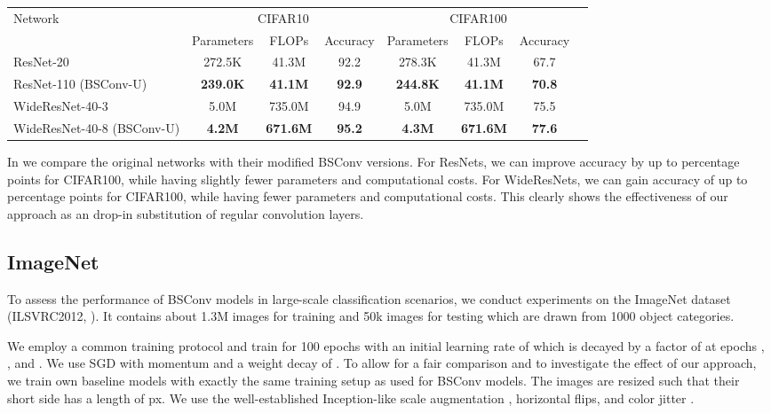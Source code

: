 \documentclass[10pt,twocolumn,letterpaper]{article}
\newcommand{\DCCK}{BSConv\xspace}
\newcommand{\DCCKU}{\DCCK-U\xspace}
\begin{document}
\begin{table*}
	\begin{center}
		\begin{tabular}{|l|c|c|c|c|c|c|c|}
			\hline
			Network & \multicolumn{3}{|c|}{CIFAR10} & \multicolumn{3}{|c|}{CIFAR100} \\
			 &  Parameters & FLOPs & Accuracy & Parameters & FLOPs & Accuracy \\
			\hline
			ResNet-20 \cite{he2016deep} 	& 272.5K & 41.3M & 92.2 & 278.3K & 41.3M & 67.7 \\
			ResNet-110 (\DCCKU) 			& \bf{239.0K} & \bf{41.1M} & \bf{92.9} & \bf{244.8K} & \bf{41.1M} & \bf{70.8} \\
			\hline
			WideResNet-40-3 \cite{zagoruyko2016wide} & 5.0M & 735.0M & 94.9 & 5.0M & 735.0M & 75.5 \\
			WideResNet-40-8 (\DCCKU)	 	& \bf{4.2M} & \bf{671.6M} & \bf{95.2} & \bf{4.3M} & \bf{671.6M} & \bf{77.6} \\
			\hline
			\end{tabular}
		\end{center}
	\caption{ResNets and WideResNets on CIFAR10 and CIFAR100.
		We increase the depth and width factor of each \DCCK model such that its parameter count matches the parameter count of the corresponding baseline model.
	}
	\label{tab:CIFAR-ResNet}
\end{table*}

In  we compare the original networks with their modified \DCCK versions.
For ResNets, we can improve accuracy by up to  percentage points for CIFAR100, while having slightly fewer parameters and computational costs.
For WideResNets, we can gain accuracy of up to  percentage points for CIFAR100, while having fewer parameters and computational costs.
This clearly shows the effectiveness of our approach as an drop-in substitution of regular convolution layers.

\subsection{ImageNet}
To assess the performance of \DCCK models in large-scale classification scenarios, we conduct experiments on the ImageNet dataset (ILSVRC2012, \cite{russakovsky2015imagenet}).
It contains about 1.3M images for training and 50k images for testing which are drawn from 1000 object categories.

We employ a common training protocol and train for 100 epochs with
an initial learning rate of  which is decayed by a factor of  at epochs , , and .
We use SGD with momentum  and a weight decay of .
To allow for a fair comparison and to investigate the effect of our approach, we train own baseline models with exactly the same training setup as used for \DCCK models.
The images are resized such that their short side has a length of  px.
We use the well-established Inception-like scale augmentation \cite{szegedy2015going}, horizontal flips, and color jitter \cite{krizhevsky2012imagenet}.
\end{document}
